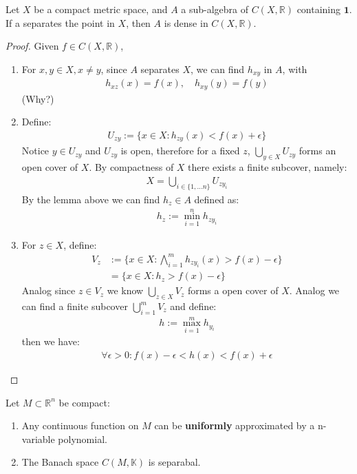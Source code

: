 \begin{theorem}
	Let $X$ be a compact metric space, and $A$ a sub-algebra of $C(X, \mathbb{R})$ containing $\mathbf{1}$. If a separates the point in $X$, then $A$ is dense in $C(X, \mathbb{R})$.
\end{theorem}
\begin{proof}
	Given $f \in C(X, \mathbb{R})$, 
	\begin{enumerate}
		\item For $x, y \in X, x \neq y$, since $A$ separates $X$, we can find $h_{xy}$ in $A$, with
		\begin{align*}
			h_{xz}(x) = f(x), \quad h_{xy}(y) = f(y)
		\end{align*}
		(Why?)
		\item Define:
		\begin{align*}
			U_{zy}:= \bigg\{ x \in X: h_{zy}(x) < f(x) + \epsilon \bigg\}
		\end{align*}
		Notice $y \in U_{zy}$ and $U_{zy}$ is open, therefore for a fixed $z$, $\bigcup_{y \in X} U_{zy}$ forms an open cover of $X$. By compactness of $X$ there exists a finite subcover, namely:
		\begin{align*}
			X = \bigcup_{i \in \{1, \dots n\}} U_{zy_i}
		\end{align*}
		By the lemma above we can find $h_{z} \in A$ defined as:
		\begin{align*}
			h_z:= \min_{i = 1}^n h_{z y_i}
		\end{align*}
		\item For $z \in X$, define:
		\begin{align*}
			V_z&:= \bigg\{ x \in X: \bigwedge_{i = 1}^m h_{zy_i}(x) > f(x) - \epsilon \bigg\}\\
			&= \bigg\{ x \in X: h_z > f(x) - \epsilon \bigg\}
		\end{align*}
		Analog since $z \in V_z$ we know $\bigcup_{z \in X} V_z$ forms a open cover of $X$. Analog we can find a finite subcover $\bigcup_{i = 1}^m V_z$ and define:
		\begin{align*}
			h:= \max_{i = 1}^m h_{y_i} 
		\end{align*}
		then we have:
		\begin{align*}
			\forall \epsilon > 0: f(x) - \epsilon < h(x) < f(x) + \epsilon
		\end{align*}
	\end{enumerate}
\end{proof}

\begin{corollary}
	Let $M \subset \mathbb{R}^n$ be compact:
	\begin{enumerate}
		\item Any continuous function on $M$ can be \textbf{uniformly} approximated by a n-variable polynomial.
		\item The Banach space $C(M, \mathbb{K})$ is separabal.
	\end{enumerate}
\end{corollary}



